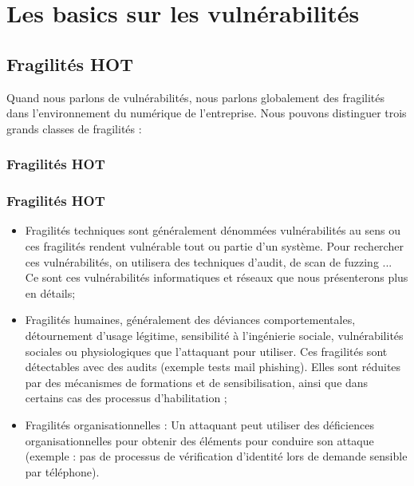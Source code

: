 \section{Les basics sur les vulnérabilités}

\subsection{Fragilités HOT}

Quand nous parlons de vulnérabilités, nous parlons globalement des fragilités dans l’environnement du numérique de l’entreprise. Nous pouvons distinguer trois grands classes de fragilités :

\begin{frame}
\frametitle<presentation>{Fragilités HOT}
\end{frame}

\begin{frame}
\frametitle<presentation>{Fragilités HOT}
\begin{itemize}
\item Fragilités techniques sont généralement dénommées vulnérabilités au sens ou ces fragilités rendent vulnérable tout ou partie d’un système. Pour rechercher ces vulnérabilités, on utilisera des techniques d’audit, de scan de fuzzing ... Ce sont ces vulnérabilités informatiques et réseaux que nous présenterons plus en détails;
\item Fragilités humaines, généralement des déviances comportementales, détournement d’usage légitime, sensibilité à l’ingénierie sociale, vulnérabilités sociales ou physiologiques que l’attaquant pour utiliser. Ces fragilités sont détectables avec des audits (exemple tests mail phishing). Elles sont réduites par des mécanismes de formations et de sensibilisation, ainsi que dans certains cas des processus d’habilitation ;
\item Fragilités organisationnelles : Un attaquant peut utiliser des déficiences organisationnelles pour obtenir des éléments pour conduire son attaque (exemple : pas de processus de vérification d’identité lors de demande sensible par téléphone).
\end{itemize}
\end{frame}



